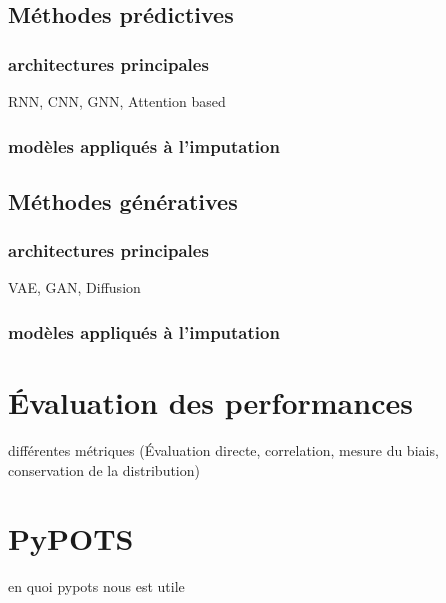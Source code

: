 \subsection{Méthodes prédictives}

\subsubsection{architectures principales}

RNN, CNN, GNN, Attention based

\subsubsection*{modèles appliqués à l'imputation}

\subsection{Méthodes génératives}

\subsubsection{architectures principales}

VAE, GAN, Diffusion
\subsubsection*{modèles appliqués à l'imputation}


\section{Évaluation des performances}
différentes métriques (Évaluation directe, correlation, mesure du biais, conservation de la distribution)

\section{PyPOTS}

en quoi pypots nous est utile
